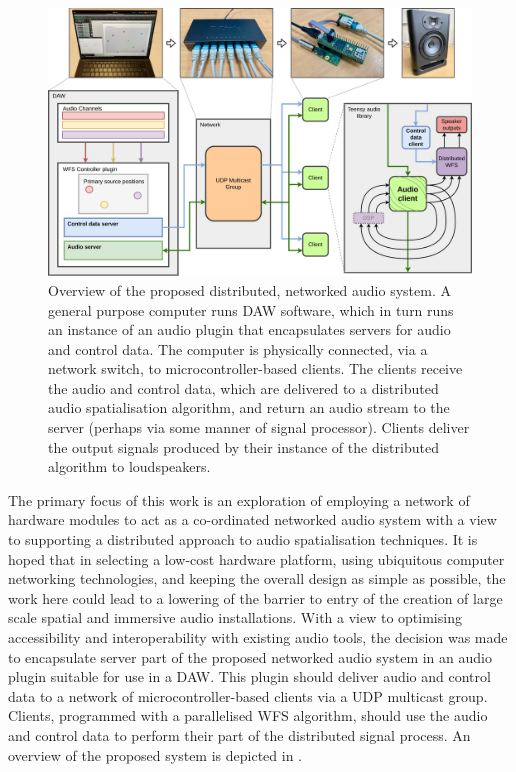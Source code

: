 \begin{figure}[ht]
    \centering
    \includegraphics[width=\textwidth]{figures/system_overview}
    \caption{
        Overview of the proposed distributed, networked audio system.
        A general purpose computer runs DAW software, which in turn runs an
        instance of an audio plugin that encapsulates servers for audio and
        control data.
        The computer is physically connected, via a network switch, to
        microcontroller-based clients.
        The clients receive the audio and control data, which are delivered to
        a distributed audio spatialisation algorithm, and return an audio stream
        to the server (perhaps via some manner of signal processor).
        Clients deliver the output signals produced by their instance of the
        distributed algorithm to loudspeakers.
    }
    \label{fig:system-overview}
\end{figure}

The primary focus of this work is an exploration of employing a network of
hardware modules to act as a co-ordinated networked audio system with a view to
supporting a distributed approach to audio spatialisation techniques.
It is hoped that in selecting a low-cost hardware platform, using ubiquitous
computer networking technologies, and keeping the overall design as simple as
possible, the work here could lead to a lowering of the barrier to entry of
the creation of large scale spatial and immersive audio installations.
With a view to optimising accessibility and interoperability with existing audio
tools, the decision was made to encapsulate server part of the proposed
networked audio system in an audio plugin suitable for use in a DAW\@.
This plugin should deliver audio and control data to a network of
microcontroller-based clients via a UDP multicast group.
Clients, programmed with a parallelised WFS algorithm, should use the audio and
control data to perform their part of the distributed signal process.
An overview of the proposed system is depicted in .

